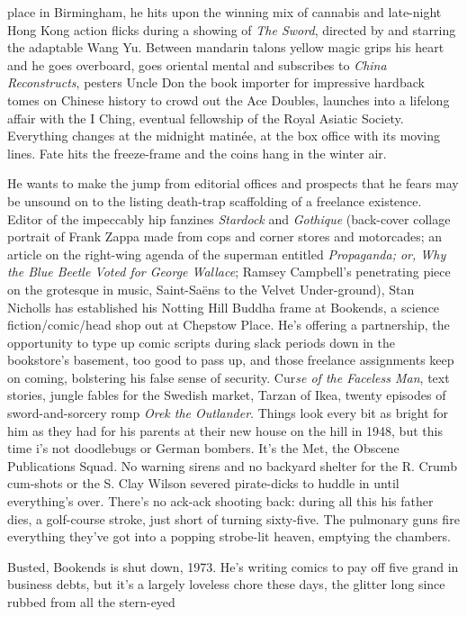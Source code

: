 \documentclass[
]{article}
\begin{document}
place in Birmingham, he hits upon the winning mix of cannabis and
late-night Hong Kong action flicks during a showing of \emph{The Sword},
directed by and starring the adaptable Wang Yu. Between mandarin talons
yellow magic grips his heart and he goes overboard, goes oriental mental
and subscribes to \emph{China Reconstructs}, pesters Uncle Don the book
importer for impressive hardback tomes on Chinese history to crowd out
the Ace Doubles, launches into a lifelong affair with the I Ching,
eventual fellowship of the Royal Asiatic Society. Everything changes at
the midnight matinée, at the box office with its moving lines. Fate hits
the freeze-frame and the coins hang in the winter air. \par
He wants to make the jump from editorial offices and prospects
that he fears may be unsound on to the listing death-trap scaffolding of
a freelance existence. Editor of the impeccably hip fanzines
\emph{Stardock} and \emph{Gothique} (back-cover collage portrait of
Frank Zappa made from cops and corner stores and motorcades; an article
on the right-wing agenda of the superman entitled \emph{Propaganda; or,
Why the Blue Beetle Voted for George Wallace}; Ramsey Campbell's
penetrating piece on the grotesque in music, Saint-Saëns to the Velvet
Under-ground), Stan Nicholls has established his Notting Hill Buddha
frame at Bookends, a science fiction/comic/head shop out at Chepstow
Place. He's offering a partnership, the opportunity to type up comic
scripts during slack periods down in the bookstore's basement, too good
to pass up, and those freelance assignments keep on coming, bolstering
his false sense of security. Cur\emph{se of the Faceless Man}, text
stories, jungle fables for the Swedish market, Tarzan of Ikea, twenty
episodes of sword-and-sorcery romp \emph{Orek the Outlander}. Things
look every bit as bright for him as they had for his parents at their
new house on the hill in 1948, but this time i's not doodlebugs or
German bombers. It's the Met, the Obscene Publications Squad. No warning
sirens and no backyard shelter for the R. Crumb cum-shots or the S. Clay
Wilson severed pirate-dicks to huddle in until everything's over.
There's no ack-ack shooting back: during all this his father dies, a
golf-course stroke, just short of turning sixty-five. The pulmonary guns
fire everything they've got into a popping strobe-lit heaven, emptying
the chambers. \par
Busted, Bookends is shut down, 1973. He's writing comics to pay
off five grand in business debts, but it's a largely loveless chore
these days, the glitter long since rubbed from all the stern-eyed
\end{document}
